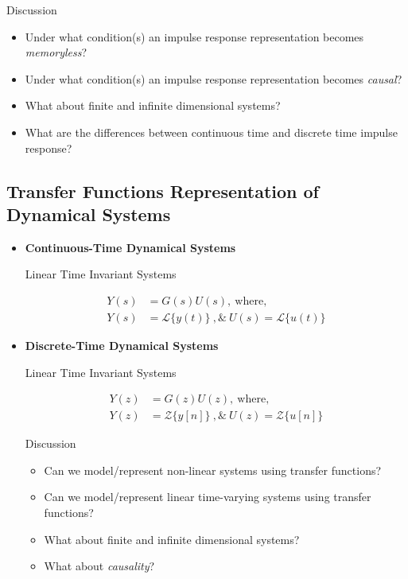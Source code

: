 \documentclass[12pt,oneside]{amsart}
\begin{document}
\vspace{12pt}

Discussion

\vspace{6pt}

\begin{itemize}
  \item Under what condition(s) an impulse response representation 
    becomes \textit{memoryless}?
  \item Under what condition(s) an impulse response representation 
    becomes \textit{causal}?
  \item What about finite and infinite dimensional systems?
  \item What are the differences between continuous time and discrete
    time impulse response?
\end{itemize}

\subsection{Transfer Functions Representation of Dynamical Systems}

\begin{itemize}

\item \textbf{Continuous-Time Dynamical Systems}

Linear Time Invariant Systems

\begin{align*}
  Y(s) &= G(s) U(s) , \ \mathrm{where}  , \\
  Y(s) &= \mathcal{L}\lbrace y(t) \rbrace \ , \& \   
  U(s) = \mathcal{L}\lbrace u(t) \rbrace
\end{align*}

\vspace{12pt}

\item \textbf{Discrete-Time Dynamical Systems}

Linear Time Invariant Systems

\begin{align*}
  Y(z) &= G(z) U(z) , \ \mathrm{where}  , \\
  Y(z) &= \mathcal{Z}\lbrace y[n] \rbrace \ , \& \   
  U(z) = \mathcal{Z}\lbrace u[n] \rbrace
\end{align*}

\vspace{12pt}

Discussion 

\vspace{6pt}

\begin{itemize}
  \item Can we model/represent non-linear systems using transfer
    functions?
  \item Can we model/represent linear time-varying systems using transfer
    functions? 
  \item What about finite and infinite dimensional systems?
  \item What about \textit{causality}?    
\end{itemize}

\vspace{12pt}

\end{itemize}
\end{document}
